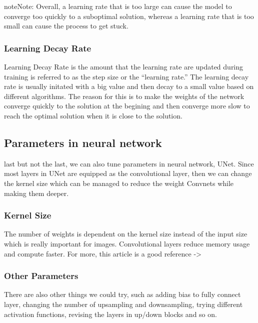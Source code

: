 \documentclass[letterpaper,10pt,english]{sphinxmanual}
\begin{document}
\begin{sphinxadmonition}{note}{Note:}
Overall, a learning rate that is too large can cause the model to converge too quickly to a suboptimal solution, whereas a learning rate that is too small can cause the process to get stuck.
\end{sphinxadmonition}


\subsubsection{Learning Decay Rate}
\label{\detokenize{usage/adjust:learning-decay-rate}}
Learning Decay Rate is the amount that the learning rate are updated during training is referred to as the step size or the “learning rate.”  The learning decay rate is usually initated with a big value and then decay to a small value based on different algorithms. The reason for this is to make the weights of the network converge quickly to the solution at the begining and then converge more slow to reach the optimal solution when it is close to the solution.


\subsection{Parameters in neural network}
\label{\detokenize{usage/adjust:parameters-in-neural-network}}
last but not the last, we can also tune parameters in neural network, UNet. Since most layers in UNet are equipped as the convolutional layer, then we can change the kernel size which can be managed to reduce the weight Convnets while making them deeper.


\subsubsection{Kernel Size}
\label{\detokenize{usage/adjust:kernel-size}}
The number of weights is dependent on the kernel size instead of the input size which is really important for images. Convolutional layers reduce memory usage and compute faster. For more, this article is a good reference -\textgreater{} 


\subsubsection{Other Parameters}
\label{\detokenize{usage/adjust:other-parameters}}
There are also other things we could try, such as adding bias to fully connect layer, changing the number of upsampling and downsampling, trying different activation functions, revising the layers in up/down blocks and so on.
\end{document}
